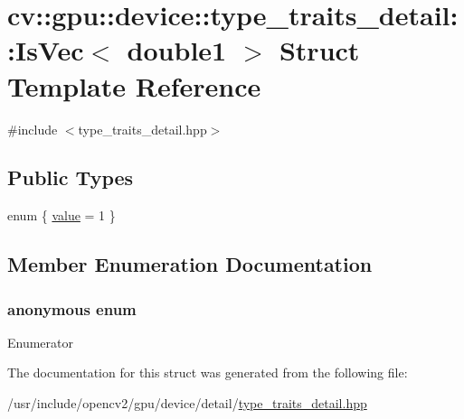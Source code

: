 \hypertarget{structcv_1_1gpu_1_1device_1_1type__traits__detail_1_1IsVec_3_01double1_01_4}{\section{cv\-:\-:gpu\-:\-:device\-:\-:type\-\_\-traits\-\_\-detail\-:\-:Is\-Vec$<$ double1 $>$ Struct Template Reference}
\label{structcv_1_1gpu_1_1device_1_1type__traits__detail_1_1IsVec_3_01double1_01_4}
}


{\ttfamily \#include $<$type\-\_\-traits\-\_\-detail.\-hpp$>$}

\subsection*{Public Types}
\begin{DoxyCompactItemize}
\item 
enum \{ \hyperlink{structcv_1_1gpu_1_1device_1_1type__traits__detail_1_1IsVec_3_01double1_01_4_a2c9c2bebde00a2c55a302a7d440cc062a9c6f26686e93db1024fc78bd29461010}{value} = 1
 \}
\end{DoxyCompactItemize}


\subsection{Member Enumeration Documentation}
\hypertarget{structcv_1_1gpu_1_1device_1_1type__traits__detail_1_1IsVec_3_01double1_01_4_a2c9c2bebde00a2c55a302a7d440cc062}{\subsubsection[{anonymous enum}]{\setlength{\rightskip}{0pt plus 5cm}anonymous enum}}\label{structcv_1_1gpu_1_1device_1_1type__traits__detail_1_1IsVec_3_01double1_01_4_a2c9c2bebde00a2c55a302a7d440cc062}
\begin{Desc}
\item[Enumerator]\par
\begin{description}
\item[{\em 
\hypertarget{structcv_1_1gpu_1_1device_1_1type__traits__detail_1_1IsVec_3_01double1_01_4_a2c9c2bebde00a2c55a302a7d440cc062a9c6f26686e93db1024fc78bd29461010}{value}\label{structcv_1_1gpu_1_1device_1_1type__traits__detail_1_1IsVec_3_01double1_01_4_a2c9c2bebde00a2c55a302a7d440cc062a9c6f26686e93db1024fc78bd29461010}
}]\end{description}
\end{Desc}


The documentation for this struct was generated from the following file\-:\begin{DoxyCompactItemize}
\item 
/usr/include/opencv2/gpu/device/detail/\hyperlink{type__traits__detail_8hpp}{type\-\_\-traits\-\_\-detail.\-hpp}\end{DoxyCompactItemize}
